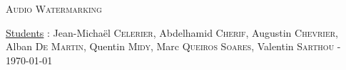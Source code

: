 \documentclass[a4paper,11pt,oneside]{report}
\begin{document}
\begin{titlepage}
  \begin{center}

    \textsc{\LARGE Audio Watermarking}\\[1cm]
    
  \end{center}
  
  \begin{flushbottom}
   \begin{flushleft}
    \underline{Students} : Jean-Michaël \textsc{Celerier}, Abdelhamid \textsc{Cherif}, Augustin \textsc{Chevrier}, Alban \textsc{De Martin}, Quentin \textsc{Midy}, Marc \textsc{Queiros Soares}, Valentin \textsc{Sarthou} - \today \\
   \end{flushleft}
  \end{flushbottom}
\end{titlepage}
\clearpage
\tableofcontents
\listoffigures










\printglossaries


\end{document}
